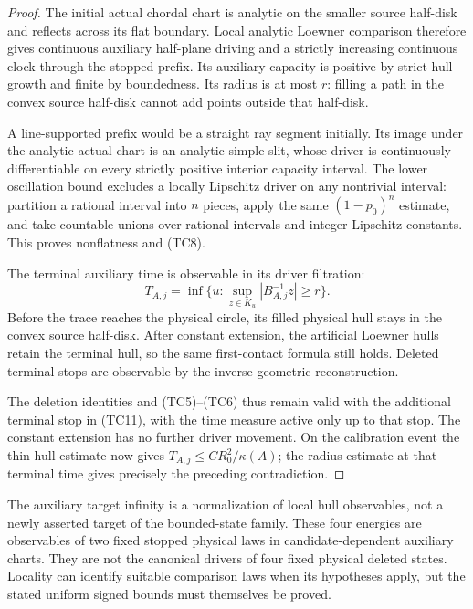 \documentclass[11pt]{article}
\theoremstyle{definition}\newtheorem{definition}[theorem]{Definition}
\theoremstyle{remark}\newtheorem{remark}[theorem]{Remark}
\begin{document}
\begin{proof}
The initial actual chordal chart is analytic on the smaller source
half-disk and reflects across its flat boundary. Local analytic
Loewner comparison therefore gives continuous auxiliary half-plane
driving and a strictly increasing continuous clock through the stopped
prefix. Its auxiliary capacity is positive by strict hull growth and
finite by boundedness. Its radius is at most $r$: filling a path in
the convex source half-disk cannot add points outside that half-disk.

A line-supported prefix would be a straight ray segment initially.
Its image under the analytic actual chart is an analytic simple
slit, whose driver is continuously differentiable on every strictly
positive interior capacity interval. The lower oscillation bound
excludes a locally Lipschitz driver on any nontrivial interval:
partition a rational interval into $n$ pieces, apply the same
$(1-p_0)^n$ estimate, and take countable unions over rational intervals
and integer Lipschitz constants. This proves nonflatness and (TC8).

The terminal auxiliary time is observable in its driver filtration:
\[
 T_{A,j}=\inf\{u:\sup_{z\in K_u}|B_{A,j}^{-1}z|\ge r\}.
\]
Before the trace reaches the physical circle, its filled physical
hull stays in the convex source half-disk. After constant extension,
the artificial Loewner hulls retain the terminal hull, so the same
first-contact formula still holds. Deleted terminal stops are
observable by the inverse geometric reconstruction.

The deletion identities and (TC5)--(TC6) thus remain valid with the
additional terminal stop in (TC11), with the time measure active
only up to that stop. The constant extension has no further driver
movement. On the calibration event the thin-hull estimate now gives
$T_{A,j}\le CR_0^2/\kappa(A)$; the radius estimate at that terminal
time gives precisely the preceding contradiction.
\end{proof}

The auxiliary target infinity is a normalization of local hull
observables, not a newly asserted target of the bounded-state family.
These four energies are observables of two fixed stopped physical
laws in candidate-dependent auxiliary charts. They are not the
canonical drivers of four fixed physical deleted states. Locality can
identify suitable comparison laws when its hypotheses apply, but the
stated uniform signed bounds must themselves be proved.
\end{document}
